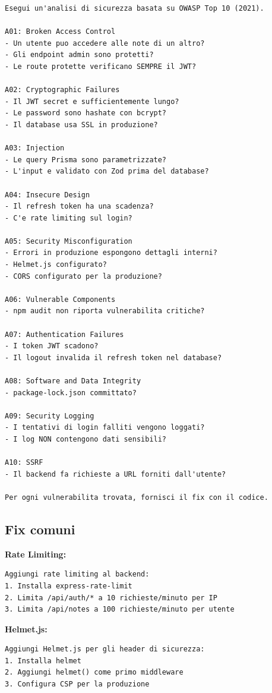 \begin{praticabox}[title={Pratica --- Audit OWASP}]
\begin{lstlisting}[language={}]
Esegui un'analisi di sicurezza basata su OWASP Top 10 (2021).

A01: Broken Access Control
- Un utente puo accedere alle note di un altro?
- Gli endpoint admin sono protetti?
- Le route protette verificano SEMPRE il JWT?

A02: Cryptographic Failures
- Il JWT secret e sufficientemente lungo?
- Le password sono hashate con bcrypt?
- Il database usa SSL in produzione?

A03: Injection
- Le query Prisma sono parametrizzate?
- L'input e validato con Zod prima del database?

A04: Insecure Design
- Il refresh token ha una scadenza?
- C'e rate limiting sul login?

A05: Security Misconfiguration
- Errori in produzione espongono dettagli interni?
- Helmet.js configurato?
- CORS configurato per la produzione?

A06: Vulnerable Components
- npm audit non riporta vulnerabilita critiche?

A07: Authentication Failures
- I token JWT scadono?
- Il logout invalida il refresh token nel database?

A08: Software and Data Integrity
- package-lock.json committato?

A09: Security Logging
- I tentativi di login falliti vengono loggati?
- I log NON contengono dati sensibili?

A10: SSRF
- Il backend fa richieste a URL forniti dall'utente?

Per ogni vulnerabilita trovata, fornisci il fix con il codice.
\end{lstlisting}
\end{praticabox}

\subsection{Fix comuni}

\textbf{Rate Limiting:}
\begin{lstlisting}[language={}]
Aggiungi rate limiting al backend:
1. Installa express-rate-limit
2. Limita /api/auth/* a 10 richieste/minuto per IP
3. Limita /api/notes a 100 richieste/minuto per utente
\end{lstlisting}

\textbf{Helmet.js:}
\begin{lstlisting}[language={}]
Aggiungi Helmet.js per gli header di sicurezza:
1. Installa helmet
2. Aggiungi helmet() come primo middleware
3. Configura CSP per la produzione
\end{lstlisting}

